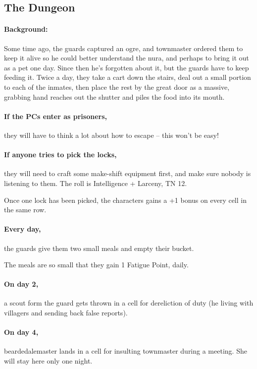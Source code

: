 \begin{multicols}{2}
\subsection{The Dungeon}
\label{stationDungeon}

\paragraph{Background:}
Some time ago, the guards captured an ogre, and \gls{townmaster} ordered them to keep it alive so he could better understand the nura, and perhaps to bring it out as a pet one day.  Since then he's forgotten about it, but the guards have to keep feeding it.  Twice a day, they take a cart down the stairs, deal out a small portion to each of the inmates, then place the rest by the great door as a massive, grabbing hand reaches out the shutter and piles the food into its mouth.

\paragraph{If the PCs enter as prisoners,}
they will have to think a lot about how to escape -- this won't be easy!

\paragraph{If anyone tries to pick the locks,}
they will need to craft some make-shift equipment first, and make sure nobody is listening to them.
The roll is Intelligence + Larceny, TN 12.

Once one lock has been picked, the characters gains a +1 bonus on every cell in the same row.

\paragraph{Every day,}
the guards give them two small meals and empty their bucket.

The meals are so small that they gain 1 Fatigue Point, daily.

\paragraph{On day 2,}
a scout form the \gls{guard} gets thrown in a cell for dereliction of duty (he living with villagers and sending back false reports).

\paragraph{On day 4,}
\gls{beardedalemaster} lands in a cell for insulting \gls{townmaster} during a meeting.
She will stay here only one night.


\end{multicols}
